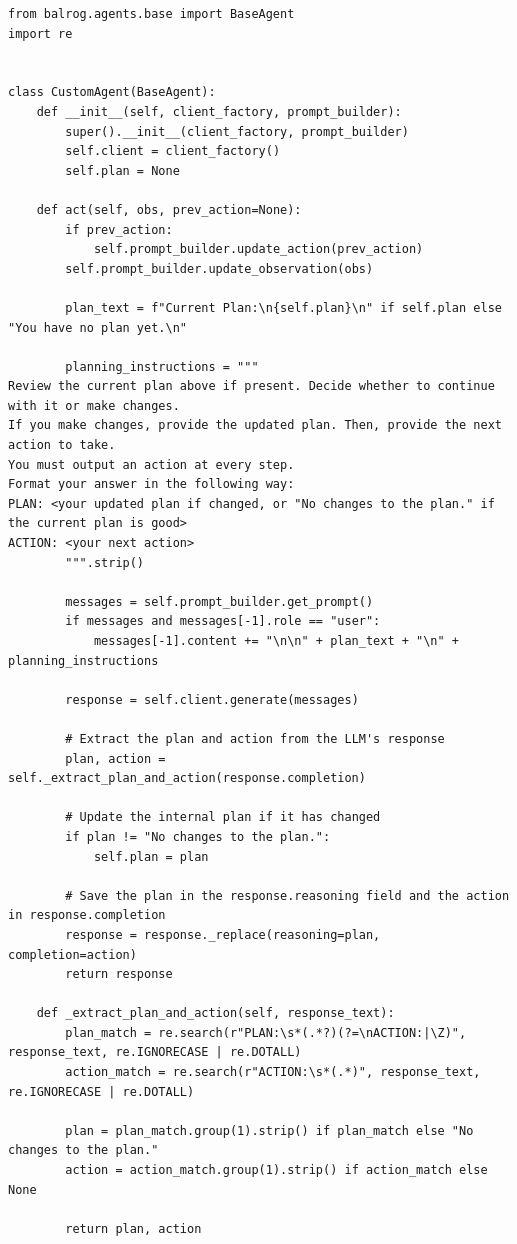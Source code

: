 \documentclass[a4]{article}
\begin{document}
\begin{listing}
\begin{verbatim}
from balrog.agents.base import BaseAgent
import re


class CustomAgent(BaseAgent):
    def __init__(self, client_factory, prompt_builder):
        super().__init__(client_factory, prompt_builder)
        self.client = client_factory()
        self.plan = None

    def act(self, obs, prev_action=None):
        if prev_action:
            self.prompt_builder.update_action(prev_action)
        self.prompt_builder.update_observation(obs)

        plan_text = f"Current Plan:\n{self.plan}\n" if self.plan else "You have no plan yet.\n"

        planning_instructions = """
Review the current plan above if present. Decide whether to continue with it or make changes.
If you make changes, provide the updated plan. Then, provide the next action to take. 
You must output an action at every step.
Format your answer in the following way:
PLAN: <your updated plan if changed, or "No changes to the plan." if the current plan is good>
ACTION: <your next action>
        """.strip()

        messages = self.prompt_builder.get_prompt()
        if messages and messages[-1].role == "user":
            messages[-1].content += "\n\n" + plan_text + "\n" + planning_instructions

        response = self.client.generate(messages)

        # Extract the plan and action from the LLM's response
        plan, action = self._extract_plan_and_action(response.completion)

        # Update the internal plan if it has changed
        if plan != "No changes to the plan.":
            self.plan = plan

        # Save the plan in the response.reasoning field and the action in response.completion
        response = response._replace(reasoning=plan, completion=action)
        return response

    def _extract_plan_and_action(self, response_text):
        plan_match = re.search(r"PLAN:\s*(.*?)(?=\nACTION:|\Z)", response_text, re.IGNORECASE | re.DOTALL)
        action_match = re.search(r"ACTION:\s*(.*)", response_text, re.IGNORECASE | re.DOTALL)

        plan = plan_match.group(1).strip() if plan_match else "No changes to the plan."
        action = action_match.group(1).strip() if action_match else None

        return plan, action
\end{verbatim}
    \caption{Agent code in BALROG}\label{lst:agent}
\end{listing}
\end{document}
